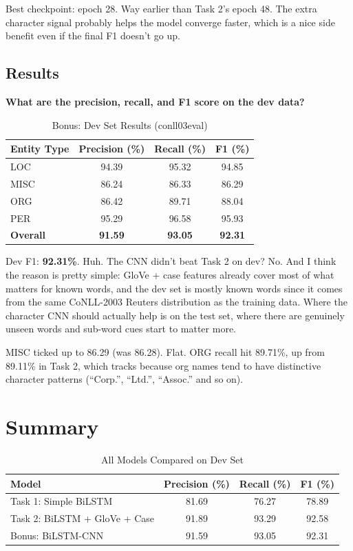\documentclass[11pt]{article}
\begin{document}
Best checkpoint: epoch 28. Way earlier than Task 2's epoch 48. The extra character signal probably helps the model converge faster, which is a nice side benefit even if the final F1 doesn't go up.

\subsection{Results}

\textbf{What are the precision, recall, and F1 score on the dev data?}

\begin{table}[h]
\centering
\caption{Bonus: Dev Set Results (conll03eval)}
\label{tab:res3}
\begin{tabular}{lccc}
\toprule
\textbf{Entity Type} & \textbf{Precision (\%)} & \textbf{Recall (\%)} & \textbf{F1 (\%)} \\
\midrule
LOC & 94.39 & 95.32 & 94.85 \\
MISC & 86.24 & 86.33 & 86.29 \\
ORG & 86.42 & 89.71 & 88.04 \\
PER & 95.29 & 96.58 & 95.93 \\
\midrule
\textbf{Overall} & \textbf{91.59} & \textbf{93.05} & \textbf{92.31} \\
\bottomrule
\end{tabular}
\end{table}

Dev F1: \textbf{92.31\%}. Huh. The CNN didn't beat Task 2 on dev? No. And I think the reason is pretty simple: GloVe + case features already cover most of what matters for known words, and the dev set is mostly known words since it comes from the same CoNLL-2003 Reuters distribution as the training data. Where the character CNN should actually help is on the test set, where there are genuinely unseen words and sub-word cues start to matter more.

MISC ticked up to 86.29 (was 86.28). Flat. ORG recall hit 89.71\%, up from 89.11\% in Task 2, which tracks because org names tend to have distinctive character patterns (``Corp.'', ``Ltd.'', ``Assoc.'' and so on).

\section{Summary}

\begin{table}[h]
\centering
\caption{All Models Compared on Dev Set}
\label{tab:summary}
\begin{tabular}{lccc}
\toprule
\textbf{Model} & \textbf{Precision (\%)} & \textbf{Recall (\%)} & \textbf{F1 (\%)} \\
\midrule
Task 1: Simple BiLSTM & 81.69 & 76.27 & 78.89 \\
Task 2: BiLSTM + GloVe + Case & 91.89 & 93.29 & 92.58 \\
Bonus: BiLSTM-CNN & 91.59 & 93.05 & 92.31 \\
\bottomrule
\end{tabular}
\end{table}
\end{document}
